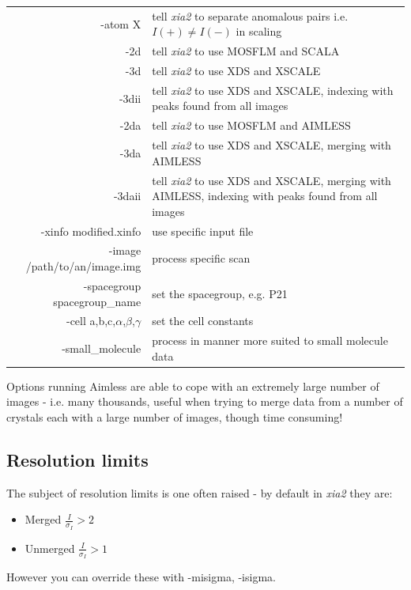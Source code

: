 \documentclass[a4paper, 11pt]{article}
\begin{document}
\begin{center}
\begin{tabular}{|r|p{6cm}|}
\hline
-atom X & tell \emph{xia2} to separate anomalous pairs i.e. $I(+) \ne I(-)$ in 
scaling \\
-2d & tell \emph{xia2} to use MOSFLM and SCALA \\
-3d & tell \emph{xia2} to use XDS and XSCALE \\
-3dii & tell \emph{xia2} to use XDS and XSCALE, indexing with
    peaks found from all images \\
-2da & tell \emph{xia2} to use MOSFLM and AIMLESS \\
-3da & tell \emph{xia2} to use XDS and XSCALE, merging with AIMLESS \\
-3daii & tell \emph{xia2} to use XDS and XSCALE, merging with AIMLESS,
indexing with peaks found from all images \\
-xinfo modified.xinfo & use specific input file \\
-image /path/to/an/image.img & process specific scan \\
-spacegroup spacegroup\_name & set the spacegroup, e.g. P21 \\
-cell a,b,c,$\alpha$,$\beta$,$\gamma$ & set the cell constants \\ 
-small\_molecule & process in manner more suited to small molecule data \\
\hline
\end{tabular}
\end{center}

\noindent
Options running Aimless are able to cope with an extremely large
number of images - i.e. many thousands, useful when trying to merge
data from a 
number of crystals each with a large number of images, though time consuming!

\subsection{Resolution limits}

The subject of resolution limits is one often raised - by default in
\emph{xia2} they are:

\begin{itemize}
\item{Merged $\frac{I}{\sigma_I} > 2$}
\item{Unmerged $\frac{I}{\sigma_I} > 1$}
\end{itemize}

\noindent
However you can override these with -misigma, -isigma.
\end{document}
